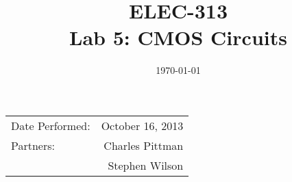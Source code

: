 \documentclass{article}
\author{}
\title{ELEC-313 \\ Lab 5: CMOS Circuits\\ }
\date{\today}
\begin{document}
\maketitle

\begin{center}
  \begin{tabular}{lr}
    Date Performed: & October 16, 2013 \\
    Partners:       & Charles Pittman    \\
    & Stephen Wilson     \\
  \end{tabular}
\end{center}

\newpage

\tableofcontents
\listoffigures
\listoftables
\newpage

\end{document}
